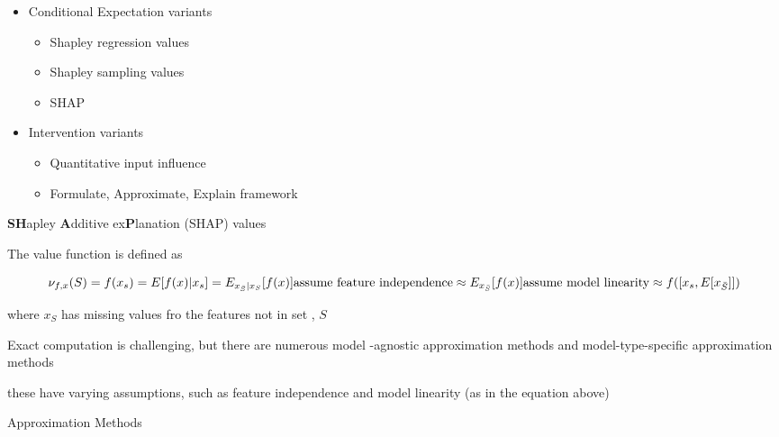 \documentclass[
]{book}
\begin{document}
\begin{itemize}
\item
  Conditional Expectation variants

  \begin{itemize}
  \item
    Shapley regression values \citep{lipovetsky2001, lipovetsky2001a}
  \item
    Shapley sampling values \citep{trumbelj2013}
  \item
    SHAP \citep{lundberg2017unified}
  \end{itemize}
\item
  Intervention variants

  \begin{itemize}
  \item
    Quantitative input influence \citep{datta2016}
  \item
    Formulate, Approximate, Explain framework \citep{merrick2020}
  \end{itemize}
\end{itemize}

\textbf{SH}apley \textbf{A}dditive ex\textbf{P}lanation (SHAP) values

The value function is defined as

\[
\nu_{f,x}(S) = f(x_s) = E[f(x)|x_s] = E_{x_{\bar{S}}|x_S}[f(x)] \\
\text{assume feature independence} \approx E_{x_{\bar{S}}}[f(x)] \\
\text{assume model linearity} \approx f([x_s, E[x_{\bar{S}}]])
\]

where \(x_S\) has missing values fro the features not in set , \(S\)

Exact computation is challenging, but there are numerous model -agnostic approximation methods and model-type-specific approximation methods

these have varying assumptions, such as feature independence and model linearity (as in the equation above)

Approximation Methods
\end{document}
